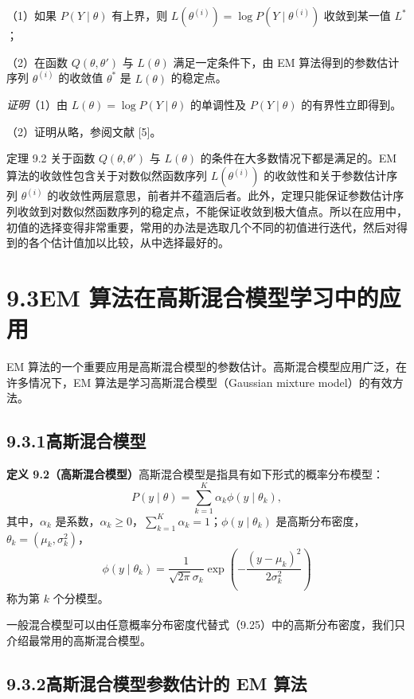 \documentclass[UTF8,12pt,a4paper,fontset=fandol]{ctexart}
\begin{document}
（1）如果 $P(Y\mid\theta)$ 有上界，则 $L(\theta^{(i)})=\log P(Y\mid\theta^{(i)})$ 收敛到某一值 $L^*$；

（2）在函数 $Q(\theta,\theta')$ 与 $L(\theta)$ 满足一定条件下，由 EM 算法得到的参数估计序列 $\theta^{(i)}$ 的收敛值 $\theta^*$ 是 $L(\theta)$ 的稳定点。

\noindent\textit{证明}\quad （1）由 $L(\theta)=\log P(Y\mid\theta)$ 的单调性及 $P(Y\mid\theta)$ 的有界性立即得到。

（2）证明从略，参阅文献 [5]。

定理 9.2 关于函数 $Q(\theta,\theta')$ 与 $L(\theta)$ 的条件在大多数情况下都是满足的。EM 算法的收敛性包含关于对数似然函数序列 $L(\theta^{(i)})$ 的收敛性和关于参数估计序列 $\theta^{(i)}$ 的收敛性两层意思，前者并不蕴涵后者。此外，定理只能保证参数估计序列收敛到对数似然函数序列的稳定点，不能保证收敛到极大值点。所以在应用中，初值的选择变得非常重要，常用的办法是选取几个不同的初值进行迭代，然后对得到的各个估计值加以比较，从中选择最好的。

\section*{9.3\quad EM 算法在高斯混合模型学习中的应用}

EM 算法的一个重要应用是高斯混合模型的参数估计。高斯混合模型应用广泛，在许多情况下，EM 算法是学习高斯混合模型（Gaussian mixture model）的有效方法。

\subsection*{9.3.1\quad 高斯混合模型}

\noindent\textbf{定义 9.2（高斯混合模型）}\quad 高斯混合模型是指具有如下形式的概率分布模型：
\begin{equation}
  P(y\mid\theta)=\sum_{k=1}^K \alpha_k\phi(y\mid\theta_k),
  \tag{9.24}
\end{equation}
其中，$\alpha_k$ 是系数，$\alpha_k\geq0$，$\sum_{k=1}^K \alpha_k=1$；$\phi(y\mid\theta_k)$ 是高斯分布密度，$\theta_k=(\mu_k,\sigma_k^2)$，
\begin{equation}
  \phi(y\mid\theta_k)=\frac1{\sqrt{2\pi}\sigma_k}
  \exp\left(-\frac{(y-\mu_k)^2}{2\sigma_k^2}\right)
  \tag{9.25}
\end{equation}
称为第 $k$ 个分模型。

一般混合模型可以由任意概率分布密度代替式（9.25）中的高斯分布密度，我们只介绍最常用的高斯混合模型。

\subsection*{9.3.2\quad 高斯混合模型参数估计的 EM 算法}
\end{document}

